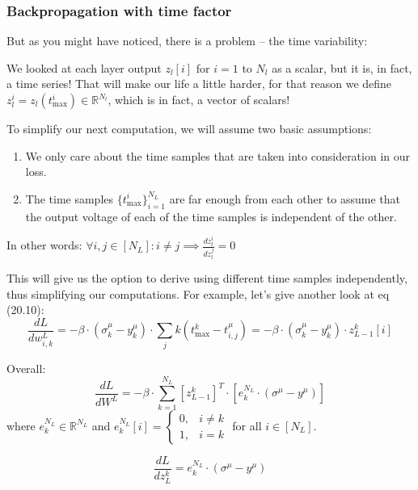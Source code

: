 \subsubsection{Backpropagation with time factor}

But as you might have noticed, there is a problem – the time variability:

We looked at each layer output \(z_l[i]\) for \(i=1\) to \(N_l\) as a scalar, but it is, in fact, a time series!
That will make our life a little harder, for that reason we define \(z_l^i = z_l(t_{\text{max}}^i) \in \mathbb{R}^{N_l}\), which is in fact, a vector of scalars!

To simplify our next computation, we will assume two basic assumptions:
\begin{enumerate}
    \item We only care about the time samples that are taken into consideration in our loss.

    \item The time samples \(\{t_{\text{max}}^i\}_{i=1}^{N_L}\) are far enough from each other to assume that the output voltage of each of the time samples is independent of the other.
\end{enumerate}

In other words: \(\forall i,j \in [N_L]: i \neq j \implies \frac{dz_l^i}{dz_l^j} = 0\)

This will give us the option to derive using different time samples independently, thus simplifying our computations. For example, let's give another look at eq (20.10):
\begin{equation}
\frac{dL}{dw_{i,k}^L} = -\beta \cdot (\sigma_k^\mu - y_k^\mu) \cdot \sum_j k(t_{\text{max}}^k - t_{i,j}^\mu) = -\beta \cdot (\sigma_k^\mu - y_k^\mu) \cdot z_{L-1}^k[i]
\end{equation}

Overall:
\begin{equation}
\frac{dL}{dW^L} = -\beta \cdot \sum_{k=1}^{N_L} [z_{L-1}^k]^T \cdot [e_k^{N_L} \cdot (\sigma^\mu - y^\mu)]
\end{equation}
where \(e_k^{N_L} \in \mathbb{R}^{N_L}\) and \(e_k^{N_L}[i] = \begin{cases} 0, & i \neq k \\ 1, & i = k \end{cases}\) for all \(i \in [N_L]\).

\begin{equation}
\frac{dL}{dz_L^k} = e_k^{N_L} \cdot (\sigma^\mu - y^\mu)
\end{equation}

